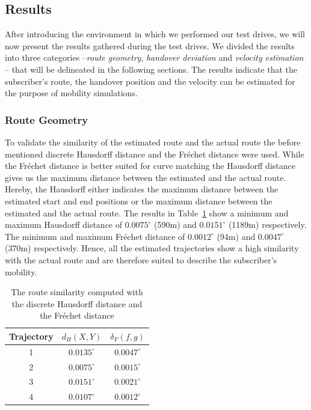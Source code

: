 \subsection{Results}
After introducing the environment in which we performed our test drives, we will now present the results gathered during the test drives. We divided the results into three categories --\emph{route geometry}, \emph{handover deviation} and \emph{velocity estimation} -- that will be delineated in the following sections. The results indicate that the subscriber's route, the handover position and the velocity can be estimated for the purpose of mobility simulations.
\subsubsection{Route Geometry}
To validate the similarity of the estimated route and the actual route the before mentioned discrete Hausdorff distance and the Fr\'{e}chet distance were used. While the Fr\'{e}chet distance is better suited for curve matching the Hausdorff distance gives us the maximum distance between the estimated and the actual route. Hereby, the Hausdorff either indicates the maximum distance between the estimated start and end positions or the maximum distance between the estimated and the actual route. The results in Table~\ref{table:routesim} show a minimum and maximum Hausdorff distance of $0.0075^\circ$ (590m) and $0.0151^\circ$ (1189m) respectively. The minimum and maximum Fr\'{e}chet distance of $0.0012^\circ$ (94m) and $0.0047^\circ$ (370m) respectively. Hence, all the estimated trajectories show a high similarity with the actual route and are therefore suited to describe the subscriber's mobility.

	\begin{table}[h]
		\caption{The route similarity computed with the discrete Hausdorff distance and the Fr\'{e}chet distance}
		\begin{tabular}{|c|c|c|}
			\hline
			\textbf{Trajectory} & \textbf{$d_{H}(X,Y)$ } & \textbf{$\delta_F(f,g)$} \\ \hline
			1                   & $0.0135^\circ$         & $0.0047^\circ$           \\ %
			2                   & $0.0075^\circ$         & $0.0015^\circ$           \\  %
			3                   & $0.0151^\circ$         & $0.0021^\circ$           \\ %
			4                   & $0.0107^\circ$         & $0.0012^\circ$           \\  \hline %
		\end{tabular}
		\label{table:routesim}
	\end{table}

